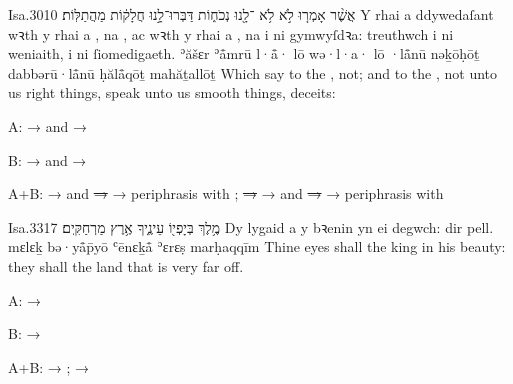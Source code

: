 \begin{example}{Isa.}{30}{10}{}{}
	\quoling
	{אֲשֶׁ֨ר אָמְר֤וּ  לֹ֣א   לֹ֥א ־לָ֖נוּ נְכֹח֑וֹת דַּבְּרוּ־לָ֣נוּ חֲלָק֔וֹת  מַהֲתַלּֽוֹת׃}
	{Y rhai a ddywedaſant wꝛth y rhai a , na , ac wꝛth y rhai a , na  i ni gymwyſdꝛa: treuthwch i ni weniaith,  i ni ſiomedigaeth.}
	{ʾăšɛr ʾå̄mrū l·å̄· lō  wə·l·a· lō ·lå̄nū nəḵōḥōṯ dabbərū·lå̄nū ḥălå̄qōṯ  mahăṯallōṯ}
	{Which say to the ,  not; and to the ,  not unto us right things, speak unto us smooth things,  deceits:}
\end{example}
\begin{compactdesc}
	\item[A:]  →  and  → 
	\item[B:]  →  and  → 
	\item[A+B:]
		 →  and  \sout{→ } → periphrasis with ;
		 \sout{→ } →  and  \sout{→ } → periphrasis with 
\end{compactdesc}

\begin{example}{Isa.}{33}{17}{}{}
	\quoling
	{מֶ֥לֶךְ בְּיָפְי֖וֹ  עֵינֶ֑יךָ  אֶ֥רֶץ מַרְחַקִּֽים׃}
	{Dy lygaid a  y bꝛenin yn ei degwch:  dir pell.}
	{mɛlɛḵ bə·yå̄p̄yō  ʿēnɛḵå̄  ʾɛrɛṣ marḥaqqīm}
	{Thine eyes shall  the king in his beauty: they shall  the land that is very far off.}
\end{example}
\begin{compactdesc}
	\item[A:]  → 
	\item[B:]  → 
	\item[A+B:]  → ;  → 
\end{compactdesc}
